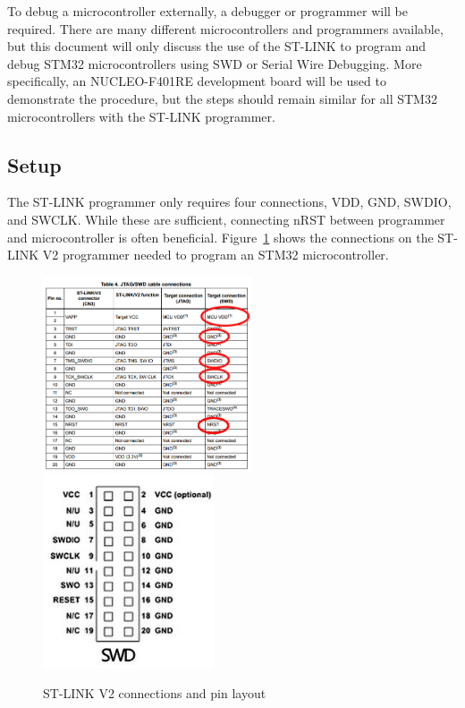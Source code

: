 \documentclass{article}
\begin{document}
  To debug a microcontroller externally, a debugger or programmer will be
  required. There are many different microcontrollers and programmers available,
  but this document will only discuss the use of the ST-LINK to program and
  debug STM32 microcontrollers using SWD or Serial Wire Debugging. More
  specifically, an NUCLEO-F401RE development board will be used to demonstrate
  the procedure, but the steps should remain similar for all STM32
  microcontrollers with the ST-LINK programmer.

  \subsection{Setup}

  The ST-LINK programmer only requires four connections, VDD, GND, SWDIO, and
  SWCLK. While these are sufficient, connecting nRST between programmer and
  microcontroller is often beneficial. Figure~\ref{fig:stlink_pinout} shows the
  connections on the ST-LINK V2 programmer needed to program an STM32
  microcontroller.

  \begin{figure}[h]
    \includegraphics[width=0.55\textwidth]{images/programming/stlink-pinout-circled.jpg}
    \includegraphics[width=0.45\textwidth]{images/programming/swd_connector.jpg}
    \caption{ST-LINK V2 connections and pin layout}
    \label{fig:stlink_pinout}
  \end{figure}
\end{document}
